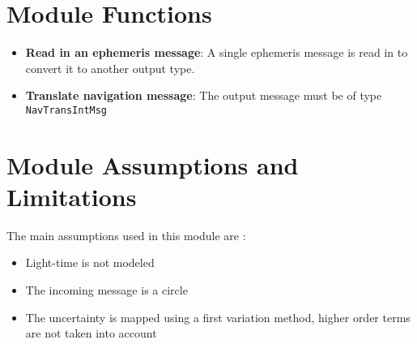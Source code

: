 

\section{Module Functions}
\begin{itemize}
	\item \textbf{Read in an ephemeris message}: A single ephemeris message is read in to convert it to another output type.
	\item \textbf{Translate navigation message}: The output message must be of type {\tt NavTransIntMsg}
\end{itemize}

\section{Module Assumptions and Limitations}

The main assumptions used in this module are :

\begin{itemize}
\item Light-time is not modeled
\item The incoming message is a circle
\item The uncertainty is mapped using a first variation method, higher order terms are not taken into account
\end{itemize}